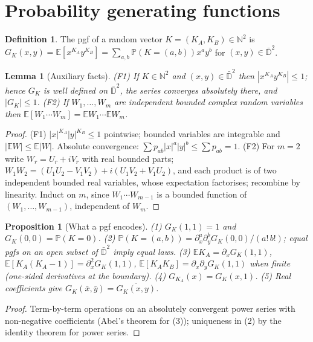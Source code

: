 \documentclass[11pt]{article}
\newtheorem{lemma}[theorem]{Lemma}
\newtheorem{proposition}[theorem]{Proposition}
\theoremstyle{definition}
\newtheorem{definition}[theorem]{Definition}
\theoremstyle{remark}
\newcommand{\E}{\mathbb{E}}
\newcommand{\Prob}{\mathbb{P}}
\newcommand{\N}{\mathbb{N}}
\newcommand{\Dbar}{\bar{\mathbb D}^2}
\begin{document}
\section{Probability generating functions}\label{sec:pgf}
\begin{definition}
The pgf of a random vector $K=(K_A,K_B)\in\N^2$ is $G_K(x,y)=\E[x^{K_A}y^{K_B}]=\sum_{a,b}\Prob(K=(a,b))x^ay^b$ for $(x,y)\in\Dbar$.
\end{definition}

\begin{lemma}[Auxiliary facts]\label{lem:aux}
(F1) If $K\in\N^2$ and $(x,y)\in\Dbar$ then $|x^{K_A}y^{K_B}|\le1$; hence $G_K$ is well defined on $\Dbar$, the series converges absolutely there, and $|G_K|\le1$.
(F2) If $W_1,\dots,W_m$ are independent bounded complex random variables then $\E[W_1\cdots W_m]=\E W_1\cdots\E W_m$.
\end{lemma}
\begin{proof}
(F1) $|x|^{K_A}|y|^{K_B}\le1$ pointwise; bounded variables are integrable and $|\E W|\le\E|W|$. Absolute convergence: $\sum p_{ab}|x|^a|y|^b\le\sum p_{ab}=1$.
(F2) For $m=2$ write $W_r=U_r+iV_r$ with real bounded parts; $W_1W_2=(U_1U_2-V_1V_2)+i(U_1V_2+V_1U_2)$, and each product is of two independent bounded real variables, whose expectation factorises; recombine by linearity. Induct on $m$, since $W_1\cdots W_{m-1}$ is a bounded function of $(W_1,\dots,W_{m-1})$, independent of $W_m$.
\end{proof}

\begin{proposition}[What a pgf encodes]\label{prop:pgfbasic}
(1) $G_K(1,1)=1$ and $G_K(0,0)=\Prob(K=0)$. (2) $\Prob(K=(a,b))=\partial_x^a\partial_y^bG_K(0,0)/(a!\,b!)$; equal pgfs on an open subset of $\Dbar$ imply equal laws. (3) $\E K_A=\partial_xG_K(1,1)$, $\E[K_A(K_A-1)]=\partial_x^2G_K(1,1)$, $\E[K_AK_B]=\partial_x\partial_yG_K(1,1)$ when finite (one-sided derivatives at the boundary). (4) $G_{K_A}(x)=G_K(x,1)$. (5) Real coefficients give $G_K(\bar x,\bar y)=\overline{G_K(x,y)}$.
\end{proposition}
\begin{proof}
Term-by-term operations on an absolutely convergent power series with non-negative coefficients (Abel's theorem for (3)); uniqueness in (2) by the identity theorem for power series.
\end{proof}
\end{document}
